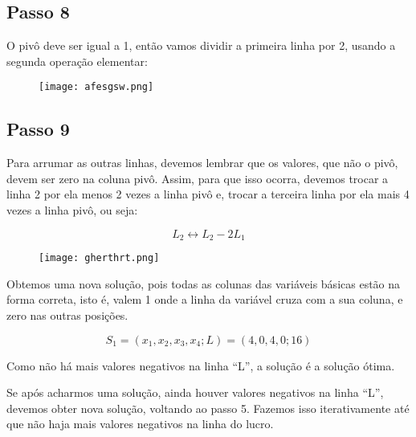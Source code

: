 \documentclass{article}
\begin{document}
\subsection{Passo 8}
O pivô deve ser igual a 1, então vamos dividir a primeira  linha por 2, usando a segunda operação elementar:

\begin{figure}[h!]
    \centering
    \texttt{[image: afesgsw.png]}
\end{figure}

\subsection{Passo 9}
Para arrumar as outras linhas, devemos lembrar que os  valores, que não o pivô, devem ser zero na coluna pivô. Assim, para  que isso ocorra, devemos trocar a linha 2 por ela menos 2 vezes a linha  pivô e, trocar a terceira linha por ela mais 4 vezes a linha pivô, ou seja:

\begin{equation}
    L_2 \leftrightarrow L_2 - 2L_1
\end{equation}

\begin{figure}[h!]
    \centering
    \texttt{[image: gherthrt.png]}
\end{figure}

Obtemos uma nova solução, pois todas as colunas das variáveis básicas  estão na forma correta, isto é, valem 1 onde a linha da variável cruza com  a sua coluna, e zero nas outras posições.

\begin{equation}
S_1 = (x_1, x_2, x_3, x_4; L) = (4, 0, 4, 0; 16)    
\end{equation}

Como não há mais valores negativos na linha “L”, a solução é a solução  ótima.

Se após acharmos uma solução, ainda houver valores negativos na linha  “L”, devemos obter nova solução, voltando ao passo 5. Fazemos isso  iterativamente até que não haja mais valores negativos na linha do lucro.
\end{document}

